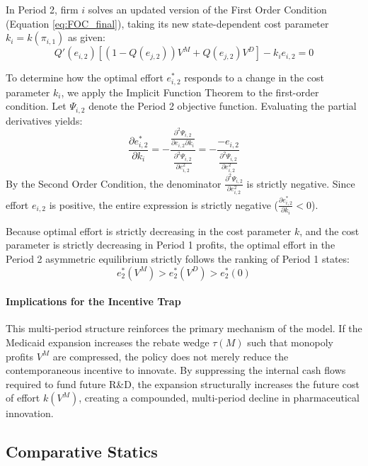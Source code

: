 \documentclass[12pt]{article}
\begin{document}
In Period 2, firm $i$ solves an updated version of the First Order Condition (Equation \ref{eq:FOC_final}), taking its new state-dependent cost parameter $k_i = k(\pi_{i,1})$ as given:
\begin{equation} \label{eq:FOC_period2}
    Q'(e_{i,2}) \left[ (1-Q(e_{j,2})) V^M + Q(e_{j,2}) V^D \right] - k_i e_{i,2} = 0
\end{equation}

To determine how the optimal effort $e_{i,2}^*$ responds to a change in the cost parameter $k_i$, we apply the Implicit Function Theorem to the first-order condition. Let $\Psi_{i,2}$ denote the Period 2 objective function. Evaluating the partial derivatives yields:
\begin{equation}
    \frac{\partial e_{i,2}^*}{\partial k_i} = - \frac{\frac{\partial^2 \Psi_{i,2}}{\partial e_{i,2} \partial k_i}}{\frac{\partial^2 \Psi_{i,2}}{\partial e_{i,2}^2}} = - \frac{-e_{i,2}}{\frac{\partial^2 \Psi_{i,2}}{\partial e_{i,2}^2}}
\end{equation}
By the Second Order Condition, the denominator $\frac{\partial^2 \Psi_{i,2}}{\partial e_{i,2}^2}$ is strictly negative. Since effort $e_{i,2}$ is positive, the entire expression is strictly negative ($\frac{\partial e_{i,2}^*}{\partial k_i} < 0$). 

Because optimal effort is strictly decreasing in the cost parameter $k$, and the cost parameter is strictly decreasing in Period 1 profits, the optimal effort in the Period 2 asymmetric equilibrium strictly follows the ranking of Period 1 states:
\begin{equation}
    e_2^*(V^M) > e_2^*(V^D) > e_2^*(0)
\end{equation}

\paragraph{Implications for the Incentive Trap}
This multi-period structure reinforces the primary mechanism of the model. If the Medicaid expansion increases the rebate wedge $\tau(M)$ such that monopoly profits $V^M$ are compressed, the policy does not merely reduce the contemporaneous incentive to innovate. By suppressing the internal cash flows required to fund future R\&D, the expansion structurally increases the future cost of effort $k(V^M)$, creating a compounded, multi-period decline in pharmaceutical innovation.

\subsection{Comparative Statics}
\end{document}
